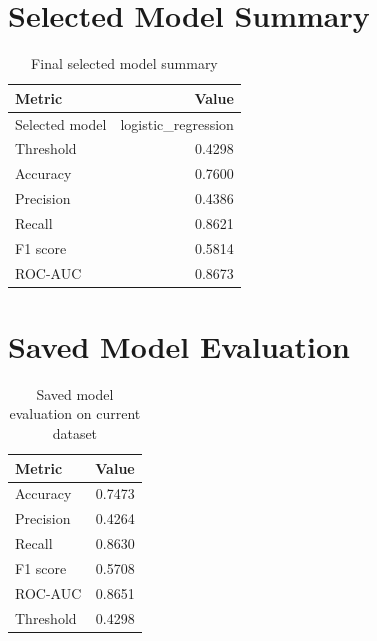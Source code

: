 \documentclass[12pt,a4paper,openany]{report}
\begin{document}
    \section{Selected Model Summary}
    \begin{table}[H]
    \centering
    \caption{Final selected model summary}
    \begin{tabular}{lr}
    \toprule
    \textbf{Metric} & \textbf{Value} \\
    \midrule
    Selected model & logistic\_regression \\
    Threshold & 0.4298 \\
    Accuracy & 0.7600 \\
    Precision & 0.4386 \\
    Recall & 0.8621 \\
    F1 score & 0.5814 \\
    ROC-AUC & 0.8673 \\
    \bottomrule
    \end{tabular}
    \end{table}

    \section{Saved Model Evaluation}
    \begin{table}[H]
    \centering
    \caption{Saved model evaluation on current dataset}
    \begin{tabular}{lr}
    \toprule
    \textbf{Metric} & \textbf{Value} \\
    \midrule
    Accuracy & 0.7473 \\
    Precision & 0.4264 \\
    Recall & 0.8630 \\
    F1 score & 0.5708 \\
    ROC-AUC & 0.8651 \\
    Threshold & 0.4298 \\
    \bottomrule
    \end{tabular}
    \end{table}
\end{document}
